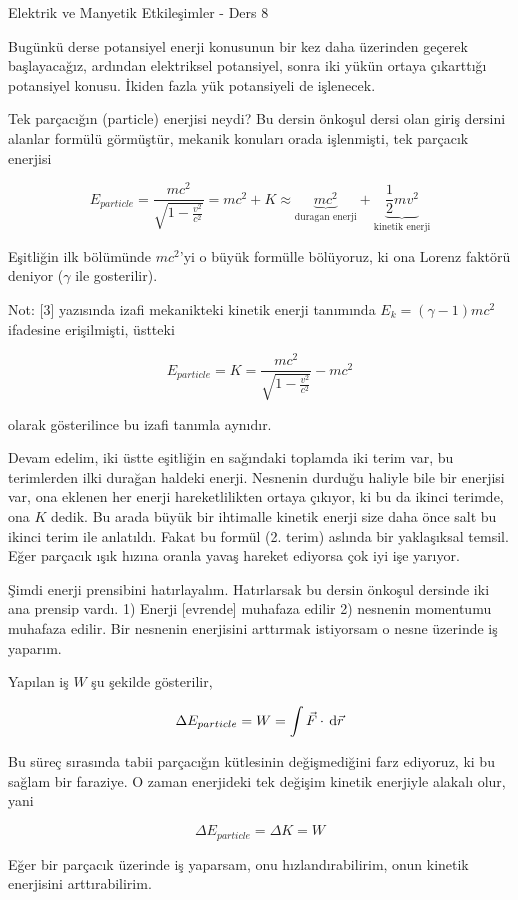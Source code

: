 \documentclass[12pt,fleqn]{article}\usepackage{../../common}
\begin{document}
Elektrik ve Manyetik Etkileşimler - Ders 8

Bugünkü derse potansiyel enerji konusunun bir kez daha üzerinden geçerek
başlayacağız, ardından elektriksel potansiyel, sonra iki yükün ortaya çıkarttığı
potansiyel konusu. İkiden fazla yük potansiyeli de işlenecek.

Tek parçacığın (particle) enerjisi neydi? Bu dersin önkoşul dersi olan giriş
dersini alanlar formülü görmüştür, mekanik konuları orada işlenmişti, tek
parçacık enerjisi

$$
E_{particle} =
\frac{mc^2}{\sqrt{1-\frac{v^2}{c^2}}} =
mc^2 + K \approx
\underbrace{mc^2}_{\textrm{duragan enerji}} +\underbrace{\frac{1}{2}mv^2}_{\textrm{kinetik enerji}}
$$

Eşitliğin ilk bölümünde $mc^2$'yi o büyük formülle bölüyoruz, ki ona Lorenz
faktörü deniyor ($\gamma$ ile gosterilir).

Not: [3] yazısında izafi mekanikteki kinetik enerji tanımında
$E_k = (\gamma - 1)mc^2$ ifadesine erişilmişti, üstteki

$$
E_{particle} = K = \frac{mc^2}{\sqrt{1-\frac{v^2}{c^2}}} -mc^2
$$

olarak gösterilince bu izafi tanımla aynıdır.

Devam edelim, iki üstte eşitliğin en sağındaki toplamda iki terim var, bu
terimlerden ilki durağan haldeki enerji. Nesnenin durduğu haliyle bile bir
enerjisi var, ona eklenen her enerji hareketlilikten ortaya çıkıyor, ki bu da
ikinci terimde, ona $K$ dedik. Bu arada büyük bir ihtimalle kinetik enerji size
daha önce salt bu ikinci terim ile anlatıldı. Fakat bu formül (2. terim) aslında
bir yaklaşıksal temsil. Eğer parçacık ışık hızına oranla yavaş hareket ediyorsa
çok iyi işe yarıyor.

Şimdi enerji prensibini hatırlayalım. Hatırlarsak bu dersin önkoşul dersinde iki
ana prensip vardı. 1) Enerji [evrende] muhafaza edilir 2) nesnenin momentumu
muhafaza edilir. Bir nesnenin enerjisini arttırmak istiyorsam o nesne üzerinde
iş yaparım.

Yapılan iş $W$ şu şekilde gösterilir,

$$
\Delta E_{particle} = W = \int \vec{F} \cdot \,\mathrm{d} \vec{r}
$$

Bu süreç sırasında tabii parçacığın kütlesinin değişmediğini farz ediyoruz, ki
bu sağlam bir faraziye. O zaman enerjideki tek değişim kinetik enerjiyle alakalı
olur, yani

$$
\Delta E_{particle} = \Delta K = W
$$

Eğer bir parçacık üzerinde iş yaparsam, onu hızlandırabilirim, onun kinetik
enerjisini arttırabilirim.
\end{document}
